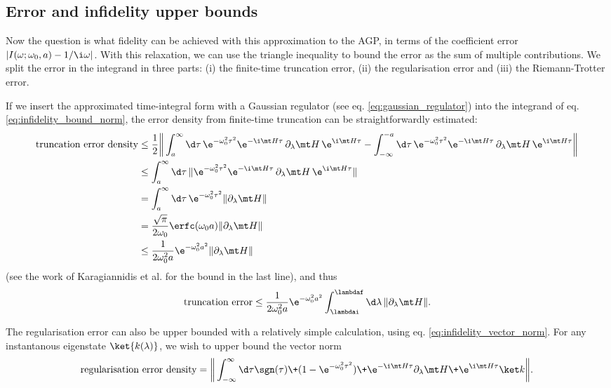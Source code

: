 \subsection{Error and infidelity upper bounds}
Now the question is what fidelity can be achieved with this approximation to the AGP, in terms of the coefficient error $|I(\omega; \omega_0, a) - 1/\i\omega|$. 
With this relaxation, we can use the triangle inequality to bound the error as the sum of multiple contributions. We split the error in the integrand in three parts: (i) the finite-time truncation error, (ii) the regularisation error and (iii) the Riemann-Trotter error. \par
If we insert the approximated time-integral form with a Gaussian regulator (see eq. \ref{eq:gaussian_regulator}) into the integrand of eq. \ref{eq:infidelity_bound_norm}, the error density from finite-time truncation can be straightforwardly estimated:
\begin{align}
    \text{truncation error density} &\leq \frac12 \bigg\| \int_a^\infty \d\tau \, \e^{-\omega_0^2 \tau^2}  \e^{-\i \mt H \tau} \, \partial_\lambda \mt H \, \e^{\i \mt H \tau} - \int_{-\infty}^{-a} \d\tau \, \e^{-\omega_0^2 \tau^2} \e^{-\i \mt H \tau} \, \partial_\lambda \mt H \, \e^{\i \mt H \tau} \bigg\| \nonumber \\
    &\leq \int_a^\infty \d\tau \, \|\e^{-\omega_0^2 \tau^2} \e^{-\i \mt H \tau} \, \partial_\lambda \mt H \, \e^{\i \mt H \tau}\| \nonumber \\
    &= \int_a^\infty \d\tau \, \e^{-\omega_0^2 \tau^2} \|\partial_\lambda \mt H\| \nonumber \\
    &= \frac{\sqrt\pi}{2\omega_0}\erfc(\omega_0 a) \|\partial_\lambda \mt H\| \nonumber \\
    &\leq \frac1{2 \omega_0^2 a} \e^{-\omega_0^2 a^2} \|\partial_\lambda \mt H\|
\end{align}
(see the work of Karagiannidis et al. \cite{Karagiannidis2007} for the bound in the last line), and thus
\begin{align}
    \text{truncation error} \leq \frac1{2 \omega_0^2 a} \e^{-\omega_0^2 a^2} \int_{\lambdai}^{\lambdaf} \d\lambda \, \|\partial_\lambda \mt H\|.
\end{align}\par
The regularisation error can also be upper bounded with a relatively simple calculation, using eq. \ref{eq:infidelity_vector_norm}. For any instantanous eigenstate $\ket{k(\lambda)}$, we wish to upper bound the vector norm
\begin{align}
    \text{regularisation error density} = \bigg\| \int_{-\infty}^\infty \d\tau \sgn(\tau) \+ (1 - \e^{-\omega_0^2\tau^2}) \+ \e^{-\i\mt H\tau} \partial_\lambda \mt H \+ \e^{\i\mt H\tau} \ket k \bigg\|.
\end{align}
